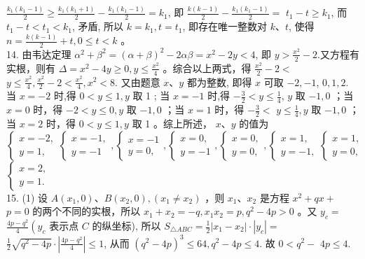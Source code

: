 \documentclass[10pt]{article}
\begin{document}
$\frac{k_{1}\left(k_{1}-1\right)}{2} \geqslant \frac{k_{1}\left(k_{1}+1\right)}{2}-\frac{k_{1}\left(k_{1}-1\right)}{2}=k_{1}$, 即 $\frac{k(k-1)}{2}-\frac{k_{1}\left(k_{1}-1\right)}{2}=$ $t_{1}-t \geqslant k_{1}$, 而 $t_{1}-t<t_{1}<k_{1}$, 矛盾, 所以 $k=k_{1}, t=t_{1}$, 即存在唯一整数对 $k 、 t$, 使得 $n=\frac{k(k-1)}{2}+t, 0 \leqslant t<k$ 。\\
14. 由韦达定理 $\alpha^{2}+\beta^{2}=(\alpha+\beta)^{2}-2 \alpha \beta=x^{2}-2 y<4$, 即 $y>\frac{x^{2}}{2}-2$.又方程有实根，则有 $\Delta=x^{2}-4 y \geqslant 0, y \leqslant \frac{x^{2}}{4}$ 。综合以上两式，得 $\frac{x^{2}}{2}-2<$ $y \leqslant \frac{x^{2}}{4}, \frac{x^{2}}{2}-2<\frac{x^{2}}{4}, x^{2}<8$. 又由题意 $x 、 y$ 都为整数, 即得 $x$ 可取 $-2,-1$, $0,1,2$. 当 $x=-2$ 时,得 $0<y \leqslant 1, y$ 取 1 ; 当 $x=-1$ 时,得 $-\frac{3}{2}<y \leqslant \frac{1}{4}$, $y$ 取 $-1,0$ ；当 $x=0$ 时，得 $-2<y \leqslant 0, y$ 取 $-1,0$ ；当 $x=1$ 时，得 $-\frac{3}{2}<$ $y \leqslant \frac{1}{4}, y$ 取 $-1,0$ ；当 $x=2$ 时，得 $0<y \leqslant 1, y$ 取 1 。综上所述， $x 、 y$ 的值为 $\left\{\begin{array}{l}x=-2, \\ y=1,\end{array}\left\{\begin{array}{l}x=-1, \\ y=-1\end{array},\left\{\begin{array}{l}x=-1 \\ y=0,\end{array},\left\{\begin{array}{l}x=0, \\ y=-1\end{array},\left\{\begin{array}{l}x=0, \\ y=0,\end{array},\left\{\begin{array}{l}x=1, \\ y=-1,\end{array}\left\{\begin{array}{l}x=1, \\ y=0,\end{array}\right.\right.\right.\right.\right.\right.\right.$ $\left\{\begin{array}{l}x=2, \\ y=1 .\end{array}\right.$\\
15. (1) 设 $A\left(x_{1}, 0\right) 、 B\left(x_{2}, 0\right),\left(x_{1} \neq x_{2}\right)$ ，则 $x_{1} 、 x_{2}$ 是方程 $x^{2}+q x+$ $p=0$ 的两个不同的实根，所以 $x_{1}+x_{2}=-q, x_{1} x_{2}=p, q^{2}-4 p>0$ 。又 $y_{c}=$ $\frac{4 p-q^{2}}{4}\left(y_{c}\right.$ 表示点 $C$ 的纵坐标), 所以 $S_{\triangle A B C}=\frac{1}{2}\left|x_{1}-x_{2}\right| \cdot\left|y_{c}\right|=$ $\frac{1}{2} \sqrt{q^{2}-4 p} \cdot\left|\frac{4 p-q^{2}}{4}\right| \leqslant 1$, 从而 $\left(q^{2}-4 p\right)^{3} \leqslant 64, q^{2}-4 p \leqslant 4$. 故 $0<q^{2}-$ $4 p \leqslant 4$.\\
\end{document}
